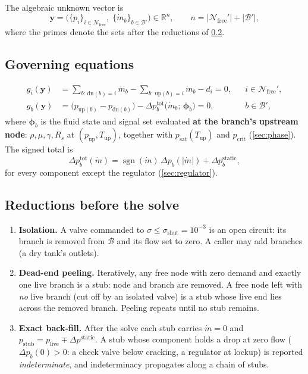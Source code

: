 \documentclass[11pt,a4paper]{article}
\newcommand{\mdot}{\dot{m}}
\newcommand{\Nfree}{\mathcal{N}_{\mathrm{free}}}
\begin{document}
The algebraic unknown vector is
\begin{equation}
  \mathbf{y} = \bigl(\{p_i\}_{i\in\Nfree},\;\{\mdot_b\}_{b\in\mathcal{B}'}\bigr)
  \in\mathbb{R}^{n},
  \qquad n = |\Nfree'| + |\mathcal{B}'|,
\end{equation}
where the primes denote the sets after the reductions of \cref{sec:reduce}.

\subsection{Governing equations}
\begin{align}
  g_i(\mathbf{y}) &=
    \sum_{b:\,\mathrm{dn}(b)=i}\mdot_b - \sum_{b:\,\mathrm{up}(b)=i}\mdot_b - d_i = 0,
    && i\in\Nfree', \label{eq:mass}\\[2pt]
  g_b(\mathbf{y}) &=
    \bigl(p_{\mathrm{up}(b)}-p_{\mathrm{dn}(b)}\bigr)
    - \Delta p_b^{\mathrm{tot}}\bigl(\mdot_b;\,\boldsymbol{\phi}_b\bigr) = 0,
    && b\in\mathcal{B}', \label{eq:branch}
\end{align}
where $\boldsymbol{\phi}_b$ is the fluid state and signal set evaluated
\textbf{at the branch's upstream node}: $\rho,\mu,\gamma,R_s$ at
$(p_{\mathrm{up}}, T_{\mathrm{up}})$, together with $p_{\mathrm{sat}}(T_{\mathrm{up}})$
and $p_{\mathrm{crit}}$ (\cref{sec:phase}). The signed total is
\begin{equation}
  \Delta p_b^{\mathrm{tot}}(\mdot)
    = \operatorname{sgn}(\mdot)\,\Delta p_b(|\mdot|) + \Delta p_b^{\mathrm{static}},
  \label{eq:signed}
\end{equation}
for every component except the regulator (\cref{sec:regulator}).

\subsection{Reductions before the solve}\label{sec:reduce}
\begin{enumerate}[label=(R\arabic*)]
\item \textbf{Isolation.} A valve commanded to $\sigma\le\sigma_{\mathrm{shut}}=10^{-3}$
      is an open circuit: its branch is removed from $\mathcal{B}$ and its flow
      set to zero. A caller may add branches (a dry tank's outlets).
\item \textbf{Dead-end peeling.} Iteratively, any free node with zero demand
      and exactly one live branch is a stub: node and branch are removed. A free
      node left with \emph{no} live branch (cut off by an isolated valve) is a
      stub whose live end lies across the removed branch. Peeling repeats until
      no stub remains.
\item \textbf{Exact back-fill.} After the solve each stub carries $\mdot=0$ and
      $p_{\mathrm{stub}} = p_{\mathrm{live}} \mp \Delta p^{\mathrm{static}}$.
      A stub whose component holds a drop at zero flow ($\Delta p_b(0)>0$: a
      check valve below cracking, a regulator at lockup) is reported
      \emph{indeterminate}, and indeterminacy propagates along a chain of stubs.
\end{enumerate}
\end{document}
